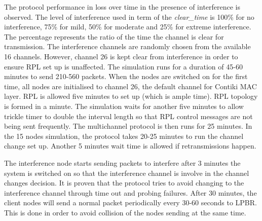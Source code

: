 The protocol performance in loss over time in the presence of interference is observed. The level of interference used in term of the \textit{clear\_time} is 100\% for no interference, 75\% for mild, 50\% for moderate and 25\% for extreme interference. The percentage represents the ratio of the time the channel is clear for transmission.
The interference channels are randomly chosen from the available 16 channels.
However, channel 26 is kept clear from interference in order to ensure RPL set up is unaffected. 
The simulation runs for a duration of 45-60 minutes to send 210-560 packets. When the nodes are switched on for the first time, all nodes are initialised to channel 26, the default channel for Contiki MAC layer. RPL is allowed five minutes to set up (which is ample time). RPL topology is formed in a minute. The simulation waits for another five minutes to allow trickle timer to double the interval length so that RPL control messages are not being sent frequently. The multichannel protocol is then runs for 25 minutes. In the 15 nodes simulation, the protocol takes 20-25 minutes to run the channel change set up. Another 5 minutes wait time is allowed if retransmissions happen. 

The interference node starts sending packets to interfere after 3 minutes the system is switched on so that the interference channel is involve in the channel changes decision. It is proven that the protocol tries to avoid changing to the interference channel through time out and probing failures. After 30 minutes, the client nodes will send a normal packet periodically every 30-60 seconds to LPBR. This is done in order to avoid collision of the nodes sending at the same time. 

